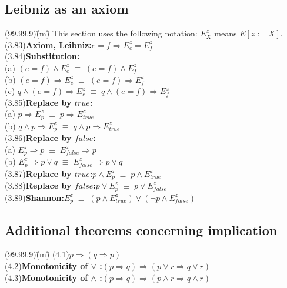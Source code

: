 \documentclass[12pt, fleqn, leqno]{article}
\newcommand{\lgap}{2pt}                             %
\newcommand{\equivs}{\ensuremath{\;\equiv\;}}       %
\newcommand{\impl}{\ensuremath{\Rightarrow}}        %
\begin{document}
\subsection*{Leibniz as an axiom}
\begin{tabbing}
(99.99.9)\;\=(m)\;\=\kill
This section uses the following notation: $E^{z}_{X}$ means $E[z := X]$.\\[\lgap]
(3.83)\>\textbf{Axiom, Leibniz:}\quad $e=f\impl E^{z}_{e} = E^{z}_{f}$\\[\lgap]
(3.84)\>\textbf{Substitution:}\\
      \> (a)\> $(e=f) \land E^{z}_{e} \equivs (e=f)\land E^{z}_{f}$\\[\lgap]
      \> (b)\> $(e=f) \impl E^{z}_{e} \equivs (e=f)\impl E^{z}_{f}$\\[\lgap]
      \> (c)\> $q\land (e=f) \impl E^{z}_{e} \equivs q\land (e=f)\impl E^{z}_{f}$\\[\lgap]
(3.85)\>\textbf{Replace by $true$:}\\
      \> (a)\> $p \impl E^{z}_{p} \equivs p\impl E^{z}_{true}$\\[\lgap]
      \> (b)\> $q\land p \impl E^{z}_{p} \equivs q\land p\impl E^{z}_{true}$\\[\lgap]
(3.86)\>\textbf{Replace by $false$:}\\
      \> (a)\> $E^{z}_{p} \impl p \equivs E^{z}_{false}\impl p$\\[\lgap]
      \> (b)\> $E^{z}_{p} \impl p\lor q \equivs E^{z}_{false}\impl p\lor q$\\[\lgap]
(3.87)\>\textbf{Replace by $true$:}\quad $p\land E^{z}_{p} \equivs p\land E^{z}_{true}$\\[\lgap]
(3.88)\>\textbf{Replace by $false$:}\quad $p\lor E^{z}_{p} \equivs p\lor E^{z}_{false}$\\[\lgap]
(3.89)\>\textbf{Shannon:}\quad $E^{z}_{p}\equivs (p\land E^{z}_{true}) \lor (\neg p\land E^{z}_{false})$\\
\end{tabbing}

\subsection*{Additional theorems concerning implication}
\begin{tabbing}
(99.99.9)\;\=(m)\;\=\kill
(4.1)\>$p\impl (q\impl p)$\\[\lgap]
(4.2)\>\textbf{Monotonicity of $\lor$ :}\quad $(p\impl q) \impl (p\lor r \impl q\lor r)$\\[\lgap]
(4.3)\>\textbf{Monotonicity of $\land$ :}\quad $(p\impl q) \impl (p\land r \impl q\land r)$\\[\lgap]
\end{tabbing}
\end{document}
